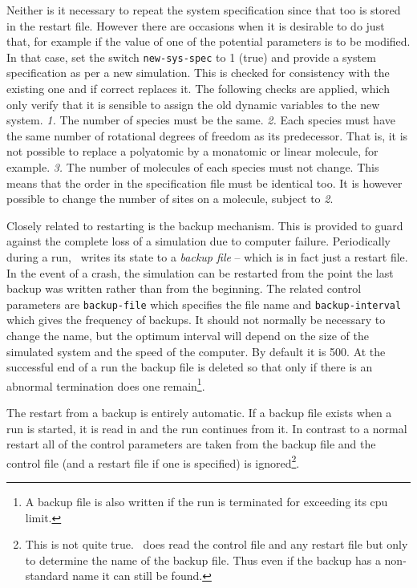 Neither is it necessary to repeat the system specification since that
too is stored in the restart file.  However there are occasions
when it is desirable to do just that, for example if the value of one
of the potential parameters is to be modified.  In that case, set the
switch \verb'new-sys-spec' to 1 (true) and provide a system
specification as per a new simulation.  This is checked for
consistency with the existing one and if correct replaces it.  The
following checks are applied, which only verify that it is sensible to
assign the old dynamic variables to the new system. {\em 1.} The
number of species must be the same. {\em 2.} Each species must have
the same number of rotational degrees of freedom as its predecessor.
That is, it is not possible to replace a polyatomic by a monatomic or
linear molecule, for example.  {\em 3.} The number of molecules of
each species must not change.  This means that the order in the
specification file must be identical too.  It is however possible to
change the number of sites on a molecule, subject to {\em 2}.

\label{sec:backup}
Closely related to restarting is the backup mechanism.  This is
provided to guard against the complete loss of a simulation due to
computer failure. Periodically during a run, \moldy\  writes its state
to a {\em backup file} -- which is in fact just a restart file.  In
the event of a crash, the simulation can be restarted from the point
the last backup was written rather than from the beginning. The
related control parameters are \verb'backup-file' which specifies the
file name and \verb'backup-interval' which gives the frequency of
backups.  It should not normally be necessary to change the name, but
the optimum interval will depend on the size of the simulated system
and the speed of the computer. By default it is 500.  At the
successful end of a run the backup file is deleted so that only if
there is an abnormal termination does one remain\footnote{A backup
file is also written if the run is terminated for exceeding its cpu
limit.}.

The restart from a backup is entirely automatic. If a backup file
exists when a run is started, it is read in and the run continues from
it.  In contrast to a normal restart all of the control parameters are
taken from the backup file and the control file (and a restart file if
one is specified) is ignored\footnote{This is not quite true. \moldy\ 
does read the control file and any restart file but only to determine the
name of the backup file. Thus even if the backup has a non-standard name
it can still be found.}.

